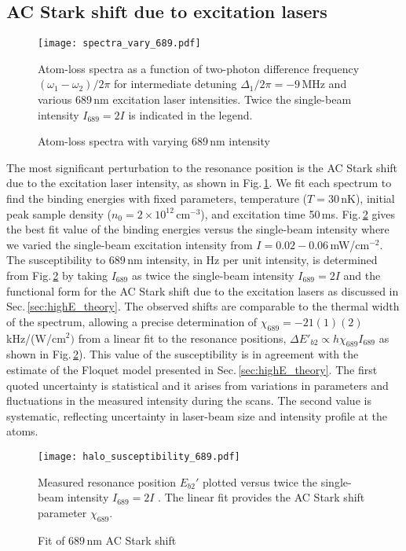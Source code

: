 \subsection{AC Stark shift due to excitation lasers}
	\begin{figure} 
	\centerline{
	  \texttt{[image: spectra\_vary\_689.pdf]}}
	  \caption{Atom-loss spectra with varying $689$\,nm intensity}{Atom-loss spectra as a function of two-photon difference frequency $(\omega_1-\omega_2)/2\pi$ for intermediate detuning $\Delta_1/2\pi=-9$\,MHz and various $689$\,nm excitation laser intensities. Twice the single-beam intensity $I_{689}=2I$ is indicated in the legend.}
	  \label{fig:SpectraVarying689Intensity}
	\end{figure}
The most significant perturbation to the resonance position is the AC Stark shift due to the excitation laser intensity, as shown in Fig.\,\ref{fig:SpectraVarying689Intensity}.
We fit each spectrum to find the binding energies with fixed parameters, temperature ($T=30$\,nK), initial peak sample density ($n_0=2\times 10^{12}$\,cm$^{-3}$), and excitation time 50\,ms.
Fig.\,\ref{fig:ShiftWith689Intensity} gives the best fit value of the binding energies versus the single-beam intensity where we varied the single-beam excitation intensity from $I=0.02-0.06$\,mW/cm$^{-2}$.
The susceptibility to $689$\,nm intensity, in Hz per unit intensity, is determined from Fig.\,\ref{fig:ShiftWith689Intensity} by taking $I_{689}$ as twice the single-beam intensity $I_{689}=2I$ and the functional form for the AC Stark shift due to the excitation lasers as discussed in Sec.\,\ref{sec:highE_theory}.
The observed shifts are comparable to the thermal width of the spectrum, allowing a precise determination of $\chi_{689}=-21(1)(2)$\,kHz/(W/cm$^{2})$ from a linear fit to the resonance positions, $\Delta E'_{b2}\propto h\chi_{689} I_{689}$ as shown in Fig.\,\ref{fig:ShiftWith689Intensity}).
This value of the susceptibility is in agreement with the estimate of the Floquet model presented in Sec.\,\ref{sec:highE_theory}.
The first quoted uncertainty is statistical and it arises from variations in parameters and fluctuations in the measured intensity during the scans.
The second value is systematic, reflecting uncertainty in laser-beam size and intensity profile at the atoms.
	\begin{figure}
	\centerline{
	  \texttt{[image: halo\_susceptibility\_689.pdf]}}
	  \caption{Fit of $689$\,nm AC Stark shift}{Measured resonance position $E_{b2}'$ plotted versus twice the single-beam intensity $I_{689}=2I$ . The linear fit provides the AC Stark shift parameter $\chi_{689}$.}
	  \label{fig:ShiftWith689Intensity}
	\end{figure}

